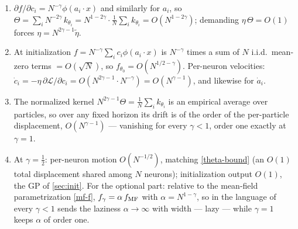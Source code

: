 \documentclass[11pt]{article}
\newcommand{\CL}{{\mathcal L}}
\newcommand{\pd}{\partial}
\begin{document}
\begin{solution}[ex:gamma]
\begin{enumerate}
  \item $\pd f/\pd c_i = N^{-\gamma}\phi(a_i\cdot x)$ and similarly for $a_i$, so $\Theta = \sum_i N^{-2\gamma}\,k_{\theta_i} = N^{1-2\gamma}\cdot\frac{1}{N}\sum_i k_{\theta_i} = O(N^{1-2\gamma})$; demanding $\eta\,\Theta = O(1)$ forces $\eta = N^{2\gamma-1}\tilde\eta$.
  \item At initialization $f = N^{-\gamma}\sum_i c_i\phi(a_i\cdot x)$ is $N^{-\gamma}$ times a sum of $N$ i.i.d.\ mean-zero terms $= O(\sqrt N)$, so $f_{\theta_0} = O(N^{1/2-\gamma})$. Per-neuron velocities: $\dot c_i = -\eta\,\pd\CL/\pd c_i = O(N^{2\gamma-1}\cdot N^{-\gamma}) = O(N^{\gamma-1})$, and likewise for $\dot a_i$.
  \item The normalized kernel $N^{2\gamma-1}\Theta = \frac{1}{N}\sum_i k_{\theta_i}$ is an empirical average over particles, so over any fixed horizon its drift is of the order of the per-particle displacement, $O(N^{\gamma-1})$ --- vanishing for every $\gamma<1$, order one exactly at $\gamma=1$.
  \item At $\gamma=\frac{1}{2}$: per-neuron motion $O(N^{-1/2})$, matching \eqref{theta-bound} (an $O(1)$ total displacement shared among $N$ neurons); initialization output $O(1)$, the GP of \cref{sec:init}. For the optional part: relative to the mean-field parametrization \eqref{mf-f}, $f_\gamma = \alpha\, f_{\rm MF}$ with $\alpha = N^{1-\gamma}$, so in the language of \cite{chizat2019lazy} every $\gamma<1$ sends the laziness $\alpha\to\infty$ with width --- lazy --- while $\gamma=1$ keeps $\alpha$ of order one.
\end{enumerate}
\end{solution}
\end{document}
